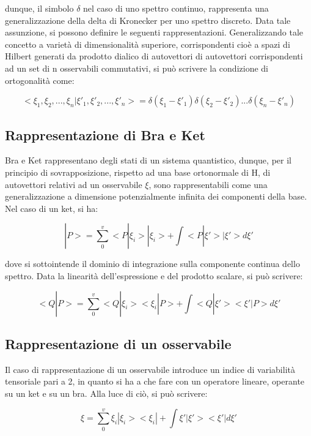 \documentclass{article}
\begin{document}
dunque, il simbolo $\delta$ nel caso di uno spettro continuo, rappresenta una generalizzazione della delta di Kronecker per uno spettro discreto.
Data tale assunzione, si possono definire le seguenti rappresentazioni.
Generalizzando tale concetto a varietà di dimensionalità superiore, corrispondenti cioè a spazi di Hilbert generati da prodotto dialico
di autovettori di autovettori corrispondenti ad un set di n osservabili commutativi, si può scrivere la condizione di ortogonalità come:

\begin{equation}
    <\xi_1,\xi_2,...,\xi_n|\xi'_1,\xi'_2,...,\xi'_n> = \delta(\xi_1-\xi'_1)\delta(\xi_2-\xi'_2)...\delta(\xi_n-\xi'_n)
\end{equation}

\subsection{Rappresentazione di Bra e Ket}
Bra e Ket rappresentano degli stati di un sistema quantistico, dunque, per il principio di sovrapposizione,
rispetto ad una base ortonormale di H, di autovettori relativi ad un osservabile $\xi$, sono rappresentabili come
una generalizzazione a dimensione potenzialmente infinita dei componenti della base.
Nel caso di un ket, si ha:

\begin{equation}
    |P>= \sum_{0}^{v} <P|\xi_i>|\xi_i>+ \int <P|\xi'>|\xi'>d\xi'
\end{equation}

dove si sottointende il dominio di integrazione sulla componente continua dello spettro.
Data la linearità dell'espressione e del prodotto scalare, si può scrivere:

\begin{equation}
    <Q|P>= \sum_{0}^{v} <Q|\xi_i><\xi_i|P>+ \int <Q|\xi'><\xi'|P>d\xi'
\end{equation}


\subsection{Rappresentazione di un osservabile}
Il caso di rappresentazione di un osservabile introduce un indice di variabilità tensoriale pari a 2, in quanto si ha a che fare con un operatore lineare, operante su un ket e su un bra.
Alla luce di ciò, si può scrivere:

\begin{equation}
    \xi = \sum_{0}^{v} \xi_i|\xi_i><\xi_i|+ \int \xi'|\xi'><\xi'|d\xi'
\end{equation}
\end{document}
